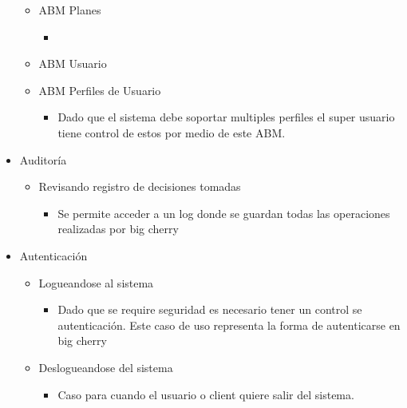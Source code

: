 \begin{itemize}
 \begin{itemize}
    \item ABM Planes
    \begin{itemize}
	\item
    \end{itemize}
    \item ABM Usuario
    \item ABM Perfiles de Usuario
    \begin{itemize}
	\item Dado que el sistema debe soportar multiples perfiles el super usuario tiene control de estos por medio de este ABM.
    \end{itemize}
 \end{itemize}
 
 \item Auditor\'ia
 \begin{itemize}
    \item Revisando registro de decisiones tomadas
    \begin{itemize}
	\item Se permite acceder a un log donde se guardan todas las operaciones realizadas por big cherry
    \end{itemize}
 \end{itemize}
 \item Autenticaci\'on
 \begin{itemize}
    \item Logueandose al sistema
    \begin{itemize}
      \item Dado que se require seguridad es necesario tener un control se autenticaci\'on. Este caso de uso representa la forma de autenticarse en big cherry
    \end{itemize}
    \item Deslogueandose del sistema
    \begin{itemize}
      \item Caso para cuando el usuario o client quiere salir del sistema.
    \end{itemize}
 \end{itemize}
\end{itemize}
